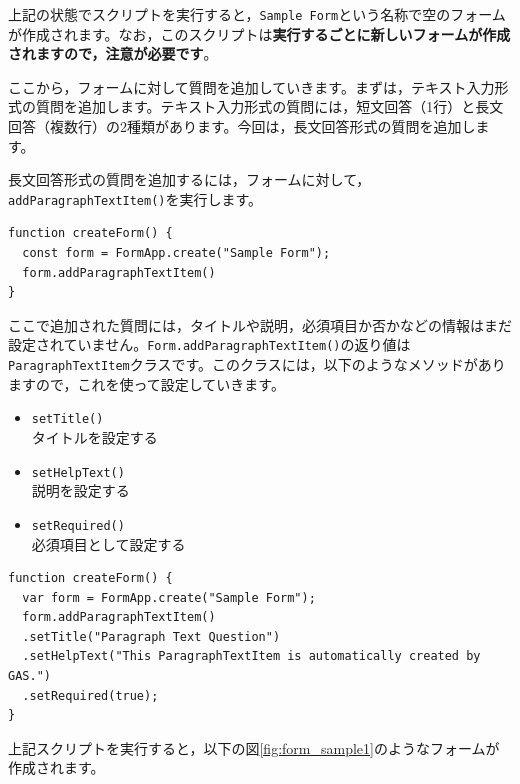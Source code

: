 \documentclass[uplatex,a4j]{jsarticle}
\begin{document}
上記の状態でスクリプトを実行すると，\verb|Sample Form|という名称で空のフォームが作成されます。なお，このスクリプトは\textbf{実行するごとに新しいフォームが作成されますので，注意が必要です}。

ここから，フォームに対して質問を追加していきます。まずは，テキスト入力形式の質問を追加します。テキスト入力形式の質問には，短文回答（1行）と長文回答（複数行）の2種類があります。今回は，長文回答形式の質問を追加します。

長文回答形式の質問を追加するには，フォームに対して，\verb|addParagraphTextItem()|を実行します。

\begin{lstlisting}[basicstyle=\ttfamily\footnotesize,frame=single,caption=FormApp sample 3]
function createForm() {
  const form = FormApp.create("Sample Form");
  form.addParagraphTextItem()
}
\end{lstlisting}

ここで追加された質問には，タイトルや説明，必須項目か否かなどの情報はまだ設定されていません。\verb|Form.addParagraphTextItem()|の返り値は\verb|ParagraphTextItem|クラスです。このクラスには，以下のようなメソッドがありますので，これを使って設定していきます。

\begin{itemize}
\item \verb|setTitle()|\\
タイトルを設定する
\item \verb|setHelpText()|\\
説明を設定する
\item \verb|setRequired()|\\
必須項目として設定する
\end{itemize}

\begin{lstlisting}[basicstyle=\ttfamily\footnotesize,frame=single,caption=FormApp sample 4]
function createForm() {
  var form = FormApp.create("Sample Form");
  form.addParagraphTextItem()
  .setTitle("Paragraph Text Question")
  .setHelpText("This ParagraphTextItem is automatically created by GAS.")
  .setRequired(true);
}
\end{lstlisting}

上記スクリプトを実行すると，以下の図\ref{fig:form_sample1}のようなフォームが作成されます。
\end{document}
